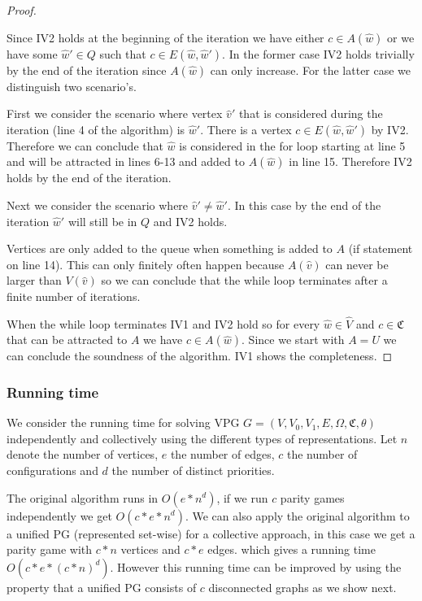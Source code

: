 \begin{theorem}
\begin{proof}
\begin{itemize}
			Since IV2 holds at the beginning of the iteration we have either $c \in A(\hat{w})$ or we have some $\hat{w}' \in Q$ such that $c \in E(\hat{w},\hat{w}')$. In the former case IV2 holds trivially by the end of the iteration since $A(\hat{w})$ can only increase. For the latter case we distinguish two scenario's. 
			
			First we consider the scenario where vertex $\hat{v}'$ that is considered during the iteration (line 4 of the algorithm) is $\hat{w}'$. There is a vertex $c \in E(\hat{w},\hat{w}')$ by IV2. Therefore we can conclude that $\hat{w}$ is considered in the for loop starting at line 5 and will be attracted in lines 6-13 and added to $A(\hat{w})$ in line 15. Therefore IV2 holds by the end of the iteration.
			
			Next we consider the scenario where $\hat{v}' \neq \hat{w}'$. In this case by the end of the iteration $\hat{w}'$ will still be in $Q$ and IV2 holds.
		\end{itemize}
	
	Vertices are only added to the queue when something is added to $A$ (if statement on line 14). This can only finitely often happen because $A(\hat{v})$ can never be larger than $V(\hat{v})$ so we can conclude that the while loop terminates after a finite number of iterations.
	
		When the while loop terminates IV1 and IV2 hold so for every $\hat{w} \in \hat{V}$ and $c \in \mathfrak{C}$ that can be attracted to $A$ we have $c \in A(\hat{w})$. Since we start with $A = U$ we can conclude the soundness of the algorithm. IV1 shows the completeness.
	\end{proof}
\end{theorem}


\subsubsection{Running time}
We consider the running time for solving VPG $G = (V,V_0,V_1,E,\Omega,\mathfrak{C},\theta)$ independently and collectively using the different types of representations. Let $n$ denote the number of vertices, $e$ the number of edges, $c$ the number of configurations and $d$ the number of distinct priorities.

The original algorithm runs in $O(e * n^d)$, if we run $c$ parity games independently we get $O(c * e * n ^d)$. We can also apply the original algorithm to a unified PG (represented set-wise) for a collective approach, in this case we get a parity game with $c*n$ vertices and $c*e$ edges. which gives a running time $O(c*e*(c*n)^d)$. However this running time can be improved by using the property that a unified PG consists of $c$ disconnected graphs as we show next.

